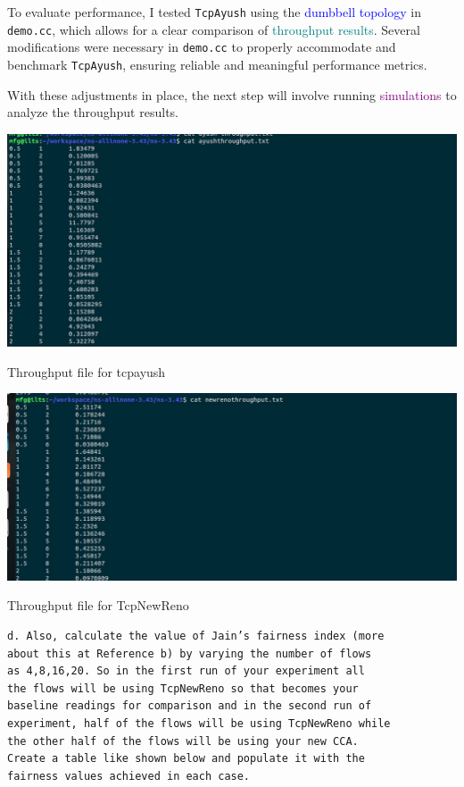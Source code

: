 \documentclass[11pt,a4paper]{article}
\begin{document}
To evaluate performance, I tested \texttt{TcpAyush} using the \textcolor{blue}{dumbbell topology} in \texttt{demo.cc}, which allows for a clear comparison of \textcolor{teal}{throughput results}. Several modifications were necessary in \texttt{demo.cc} to properly accommodate and benchmark \texttt{TcpAyush}, ensuring reliable and meaningful performance metrics.

With these adjustments in place, the next step will involve running \textcolor{purple}{simulations} to analyze the throughput results.

\begin{center}
    \includegraphics[width=1\columnwidth]{images/ayush-t.jpg}
    \caption{Throughput file for tcpayush}
\end{center}

\begin{center}
    \includegraphics[width=1\columnwidth]{images/newreno-t.jpg}
    \caption{Throughput file for TcpNewReno}
\end{center}

\begin{verbatim}
d. Also, calculate the value of Jain’s fairness index (more 
about this at Reference b) by varying the number of flows
as 4,8,16,20. So in the first run of your experiment all 
the flows will be using TcpNewReno so that becomes your 
baseline readings for comparison and in the second run of 
experiment, half of the flows will be using TcpNewReno while
the other half of the flows will be using your new CCA. 
Create a table like shown below and populate it with the 
fairness values achieved in each case.
\end{verbatim}
\end{document}
